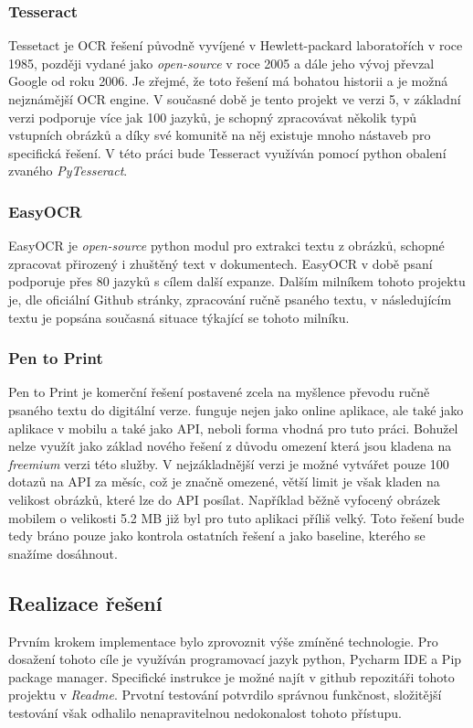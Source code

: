\documentclass[journal]{IEEEtran}
\begin{document}
\subsubsection{Tesseract}
Tessetact je \ac{OCR} řešení původně vyvíjené v Hewlett-packard laboratořích v roce 1985, později vydané jako \textit{open-source} v roce 2005 a dále jeho vývoj převzal Google od roku 2006.
Je zřejmé, že toto řešení má bohatou historii a je možná nejznámější \ac{OCR} engine.
V současné době je tento projekt ve verzi 5, v základní verzi podporuje více jak 100 jazyků, je schopný zpracovávat několik typů vstupních obrázků a díky své komunitě na něj existuje mnoho nástaveb pro specifická řešení.
V této práci bude Tesseract využíván pomocí python obalení zvaného \textit{PyTesseract}.

\subsubsection{EasyOCR}
EasyOCR je \textit{open-source} python modul pro extrakci textu z obrázků, schopné zpracovat přirozený i zhuštěný text v dokumentech.
EasyOCR v době psaní  podporuje přes 80 jazyků s cílem další expanze.
Dalším milníkem tohoto projektu je, dle oficiální Github stránky, zpracování ručně psaného textu, v následujícím textu je popsána současná situace týkající se tohoto milníku.\cite{easy_ocr}

\subsubsection{Pen to Print}
Pen to Print je komerční řešení postavené zcela na myšlence převodu ručně psaného textu do digitální verze.
funguje nejen jako online aplikace, ale také jako aplikace v mobilu a také jako \ac{API}, neboli forma vhodná pro tuto práci.
Bohužel nelze využít jako základ nového řešení z důvodu omezení která jsou kladena na \textit{freemium} verzi této služby.
V nejzákladnější verzi je možné vytvářet pouze 100 dotazů na \ac{API} za měsíc, což je značně omezené, větší limit je však kladen na velikost obrázků, které lze do \ac{API} posílat.
Například běžně vyfocený obrázek mobilem o velikosti 5.2 MB již byl pro tuto aplikaci příliš velký.
Toto řešení bude tedy bráno pouze jako kontrola ostatních řešení a jako baseline, kterého se snažíme dosáhnout.
%
\subsection{Realizace řešení}
Prvním krokem implementace bylo zprovoznit výše zmíněné technologie.
Pro dosažení tohoto cíle je využíván programovací jazyk python, Pycharm \ac{IDE} a Pip package manager.
Specifické instrukce je možné najít v github repozitáři tohoto projektu v \textit{Readme}.
Prvotní testování potvrdilo správnou funkčnost, složitější testování však odhalilo nenapravitelnou nedokonalost tohoto přístupu.
\end{document}
